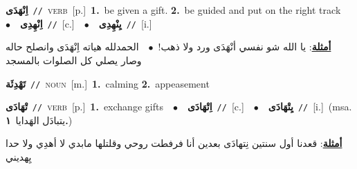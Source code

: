 \documentclass[10pt,a4paper,twoside]{article} %
\begin{document}
\begin{multicols}{2}
{\setlength\topsep{0pt}\textbf{\foreignlanguage{arabic}{اِنْهَدَى}}\ {\color{gray}\texttt{//}\color{black}}\ \textsc{verb}\ [p.]\ \textbf{1.}~be given a gift.  \textbf{2.}~be guided and put on the right track\ \ $\bullet$\ \ \setlength\topsep{0pt}\textbf{\foreignlanguage{arabic}{اِنْهِدِى}}\ {\color{gray}\texttt{//}\color{black}}\ [c.]\ \ $\bullet$\ \ \setlength\topsep{0pt}\textbf{\foreignlanguage{arabic}{يِنْهِدِى}}\ {\color{gray}\texttt{//}\color{black}}\ [i.]\  \begin{flushright}\color{gray}\foreignlanguage{arabic}{\textbf{\underline{\foreignlanguage{arabic}{أمثلة}}}: يا الله شو نفسي أنْهَدَى ورد ولا ذهب!\ $\bullet$\ \  الحمدلله هياته اِنْهَدَى وانصلح حاله وصار يصلي كل الصلوات بالمسجد}\end{flushright}\color{black}} \vspace{2mm}

{\setlength\topsep{0pt}\textbf{\foreignlanguage{arabic}{تَهْدِئَة}}\ {\color{gray}\texttt{//}\color{black}}\ \textsc{noun}\ [m.]\ \textbf{1.}~calming  \textbf{2.}~appeasement\ } \vspace{2mm}

{\setlength\topsep{0pt}\textbf{\foreignlanguage{arabic}{تْهَادَى}}\ {\color{gray}\texttt{//}\color{black}}\ \textsc{verb}\ [p.]\ \textbf{1.}~exchange gifts\ \ $\bullet$\ \ \setlength\topsep{0pt}\textbf{\foreignlanguage{arabic}{اِتْهَادَى}}\ {\color{gray}\texttt{//}\color{black}}\ [c.]\ \ $\bullet$\ \ \setlength\topsep{0pt}\textbf{\foreignlanguage{arabic}{يِتْهَادَى}}\ {\color{gray}\texttt{//}\color{black}}\ [i.]\ \color{gray}(msa. \foreignlanguage{arabic}{يتبادَل الهَدايا}~\foreignlanguage{arabic}{\textbf{١.}})\color{black}\  \begin{flushright}\color{gray}\foreignlanguage{arabic}{\textbf{\underline{\foreignlanguage{arabic}{أمثلة}}}: قعدنا أول سنتين نِتهادَى بعدين أنا فرفطت روحي وقلتلها مابدي لا أهدِي ولا حدا يِهديني}\end{flushright}\color{black}} \vspace{2mm}


\end{multicols}
\end{document}
